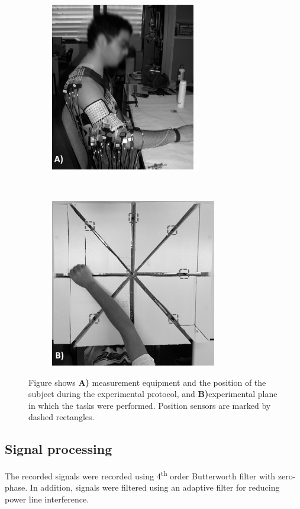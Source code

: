 \begin{figure}[t!]
    \centering
    \begin{subfigure}[t]{0.45\textwidth}
        \centering
        \includegraphics[height=2.9in]{Images/figure4_1a.png}
   
    \end{subfigure}%
    ~ 
    \begin{subfigure}[t]{0.45\textwidth}
        \centering
        \includegraphics[height=2.9in]{Images/figure4_1b.png}
        
    \end{subfigure}
    \caption{Figure shows \textbf{A)} measurement equipment and the position of the subject during the experimental protocol, and \textbf{B)}experimental plane in which the tasks were performed. Position sensors are marked by dashed rectangles.}
\label{fig:4-1}
\end{figure}


\subsection{Signal processing}
The recorded signals were recorded using 4\textsuperscript{th} order Butterworth filter with zero-phase. In addition, signals were filtered using an adaptive filter for reducing power line interference.

